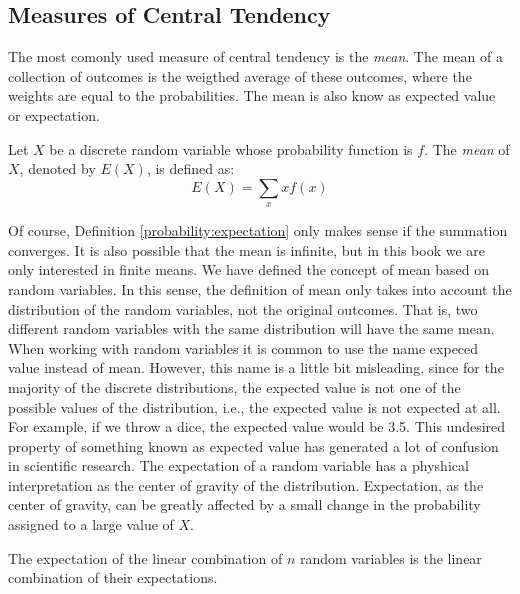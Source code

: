 
\subsection{Measures of Central Tendency}

The most comonly used measure of central tendency is the \emph{mean}. The mean of a collection of outcomes is the weigthed average of these outcomes, where the weights are equal to the probabilities. The mean is also know as expected value or expectation.

\begin{definition}\label{probability:expectation}
Let $X$ be a discrete random variable whose probability function is $f$. The \emph{mean} of $X$, denoted by $E\left(X\right)$, is defined as:
\[
E\left(X\right)=\sum_{x}xf\left(x\right)
\]
\end{definition}

Of course, Definition \ref{probability:expectation} only makes sense if the summation converges. It is also possible that the mean is infinite, but in this book we are only interested in finite means. We have defined the concept of mean based on random variables. In this sense, the definition of mean only takes into account the distribution of the random variables, not the original outcomes. That is, two different random variables with the same distribution will have the same mean. When working with random variables it is common to use the name expeced value instead of mean. However, this name is a little bit misleading, since for the majority of the discrete distributions, the expected value is not one of the possible values of the distribution, i.e., the expected value is not expected at all. For example, if we throw a dice, the expected value would be 3.5. This undesired property of something known as expected value has generated a lot of confusion in scientific research. The expectation of a random variable has a physhical interpretation as the center of gravity of the distribution. Expectation, as the center of gravity, can be greatly affected by a small change in the probability assigned to a large value of $X$.

The expectation of the linear combination of $n$ random variables is the linear combination of their expectations.

